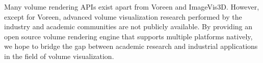 Many volume rendering APIs exist apart from Voreen and ImageVis3D. However,
except for Voreen, advanced volume visualization research performed by the
industry and academic communities are not publicly available. By providing an
open source volume rendering engine that supports multiple platforms natively,
we hope to bridge the gap between academic research and industrial applications
in the field of volume visualization.
